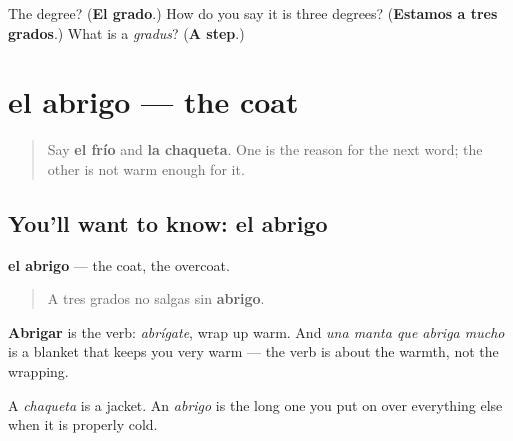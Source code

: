 \begin{tcolorbox}[breakable,colback=teal!4,colframe=teal!35!black,title={Before you move on}]
The degree? (\textbf{El grado}.) How do you say it is three degrees? (\textbf{Estamos a tres grados}.) What is a \emph{gradus}? (\textbf{A step}.)
\end{tcolorbox}
\section[el abrigo]{el abrigo — the coat}

\label{lesson:ES-C468-abrigo}



\begin{quote}
Say \textbf{el frío} and \textbf{la chaqueta}. One is the reason for the next word; the other is not warm enough for it.
\end{quote}

\subsection*{You'll want to know: el abrigo}
\textbf{el abrigo} — the coat, the overcoat.

\begin{quote}
A tres grados no salgas sin \textbf{abrigo}.
\end{quote}

\textbf{Abrigar} is the verb: \emph{abrígate}, wrap up warm. And \emph{una manta que abriga mucho} is a blanket that keeps you very warm — the verb is about the warmth, not the wrapping.

A \emph{chaqueta} is a jacket. An \emph{abrigo} is the long one you put on over everything else when it is properly cold.

